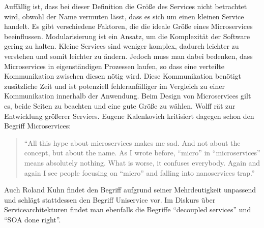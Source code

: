 Auffällig ist, dass bei dieser Definition die Größe des Services nicht betrachtet wird, obwohl der Name vermuten lässt, dass es sich um einen kleinen Service handelt. 
Es gibt verschiedene Faktoren, die die ideale Größe eines Microservices beeinflussen. Modularisierung ist ein Ansatz, um die Komplexität der Software gering zu halten. Kleine Services sind weniger komplex, dadurch leichter zu verstehen und somit leichter zu ändern. Jedoch muss man dabei bedenken, dass Microservices in eigenständigen Prozessen laufen, so dass eine verteilte Kommunikation zwischen diesen nötig wird. Diese Kommunikation benötigt zusätzliche Zeit und ist potenziell fehleranfälliger im Vergleich zu einer Kommunikation innerhalb der Anwendung. Beim Design von Microservices gilt es, beide Seiten zu beachten und eine gute Größe zu wählen. Wolff rät zur Entwicklung größerer Services. \cite[31ff.]{wolff_microservices:_2015} 
Eugene Kalenkovich kritisiert dagegen schon den Begriff Microservices:
\begin{quote}"`All this hype about microservices makes me sad. And not about the concept, but about the name. As I wrote before, “micro” in “microservices” means absolutely nothing. What is worse, it confuses everybody. Again and again I see people focusing on “micro” and falling into nanoservices trap."' \end{quote} \cite{kalenkovich_can_2014}

Auch Roland Kuhn findet den Begriff aufgrund seiner Mehrdeutigkeit unpassend und schlägt stattdessen den Begriff Uniservice vor. \cite{kuhn_microservice_2014}
Im Diskurs über Servicearchitekturen findet man ebenfalls die Begriffe "`decoupled services"' und "`SOA done right"'. \cite{white_microservices_2015} 

